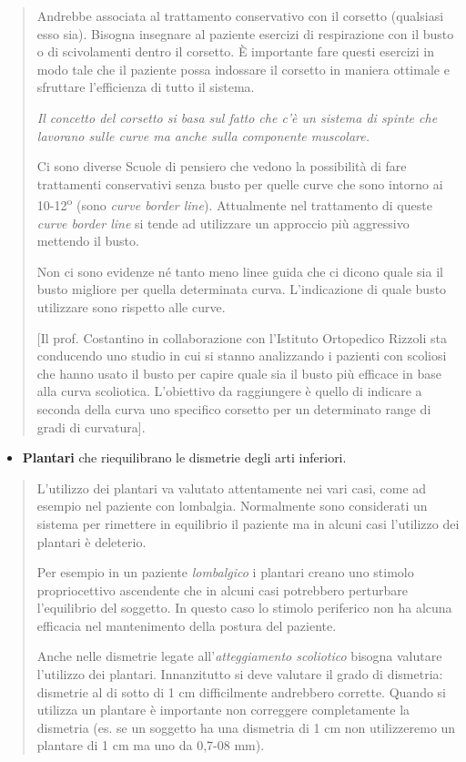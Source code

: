 \begin{quote}
Andrebbe associata al trattamento conservativo con il corsetto
(qualsiasi esso sia). Bisogna insegnare al paziente esercizi di
respirazione con il busto o di scivolamenti dentro il corsetto. È
importante fare questi esercizi in modo tale che il paziente possa
indossare il corsetto in maniera ottimale e sfruttare l'efficienza di
tutto il sistema.

\emph{Il concetto del corsetto si basa sul fatto che c'è un sistema di
spinte che lavorano sulle curve ma anche sulla componente muscolare.}

Ci sono diverse Scuole di pensiero che vedono la possibilità di fare
trattamenti conservativi senza busto per quelle curve che sono intorno
ai 10-12\textsuperscript{o} (sono \emph{curve border line}). Attualmente nel trattamento
di queste \emph{curve border line} si tende ad utilizzare un approccio
più aggressivo mettendo il busto.

Non ci sono evidenze né tanto meno linee guida che ci dicono quale sia
il busto migliore per quella determinata curva. L'indicazione di quale
busto utilizzare sono rispetto alle curve.

{[}Il prof. Costantino in collaborazione con l'Istituto Ortopedico
Rizzoli sta conducendo uno studio in cui si stanno analizzando i
pazienti con scoliosi che hanno usato il busto per capire quale sia il
busto più efficace in base alla curva scoliotica. L'obiettivo da
raggiungere è quello di indicare a seconda della curva uno specifico
corsetto per un determinato range di gradi di curvatura{]}.
\end{quote}

\begin{itemize}
\item
  \textbf{Plantari} che riequilibrano le dismetrie degli arti inferiori.
\end{itemize}

\begin{quote}
L'utilizzo dei plantari va valutato attentamente nei vari casi, come ad
esempio nel paziente con lombalgia. Normalmente sono considerati un
sistema per rimettere in equilibrio il paziente ma in alcuni casi
l'utilizzo dei plantari è deleterio.

Per esempio in un paziente \emph{lombalgico} i plantari creano uno
stimolo propriocettivo ascendente che in alcuni casi potrebbero
perturbare l'equilibrio del soggetto. In questo caso lo stimolo
periferico non ha alcuna efficacia nel mantenimento della postura del
paziente.

Anche nelle dismetrie legate all'\emph{atteggiamento scoliotico} bisogna
valutare l'utilizzo dei plantari. Innanzitutto si deve valutare il grado
di dismetria: dismetrie al di sotto di 1 cm difficilmente andrebbero
corrette. Quando si utilizza un plantare è importante non correggere
completamente la dismetria (es. se un soggetto ha una dismetria di 1 cm
non utilizzeremo un plantare di 1 cm ma uno da 0,7-08 mm).
\end{quote}

